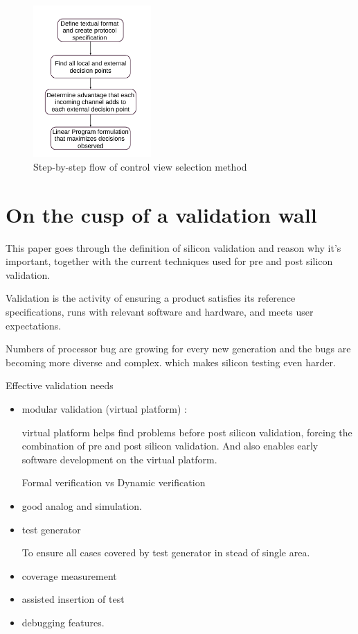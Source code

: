 \documentclass[conference]{IEEEtran}
\begin{document}
\begin{figure}
\caption{Step-by-step flow of control view selection method}
\label{control}
\centering
    \includegraphics[width=0.4\textwidth]{control}
\end{figure}




\section{On the cusp of a validation wall~\cite{validationWall}}
This paper goes through the definition of silicon validation and reason why it's important, together with the current techniques used for pre and post silicon validation.

Validation is the activity of ensuring a product satisfies its reference specifications, runs with relevant software and hardware, and meets user expectations.

Numbers of processor bug are growing for every new generation and the bugs are becoming more diverse and complex. which makes silicon testing even harder.

Effective validation needs
\begin{itemize}
\item modular validation (virtual platform) :

virtual platform helps find problems before post silicon validation, forcing the combination of pre and post silicon validation. And also enables early software development on the virtual platform.

Formal verification vs Dynamic verification
\item good analog and simulation.
\item test generator

To ensure all cases covered by test generator in stead of single area.
\item coverage measurement
\item assisted insertion of test
\item debugging features.
\end{itemize}
\end{document}
